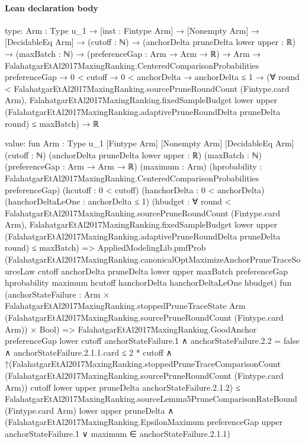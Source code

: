 \documentclass[10pt]{article}
\begin{document}
\paragraph{Lean declaration body}
\begin{ReviewVerbatim}
type:
{Arm : Type u_1} →
  [inst : Fintype Arm] →
    [Nonempty Arm] →
      [DecidableEq Arm] →
        (cutoff : ℕ) →
          (anchorDelta pruneDelta lower upper : ℝ) →
            (maxBatch : ℕ) →
              (preferenceGap : Arm → Arm → ℝ) →
                Arm →
                  FalahatgarEtAl2017MaxingRanking.CenteredComparisonProbabilities preferenceGap →
                    0 < cutoff →
                      0 < anchorDelta →
                        anchorDelta ≤ 1 →
                          (∀ round < FalahatgarEtAl2017MaxingRanking.sourcePruneRoundCount (Fintype.card Arm),
                              FalahatgarEtAl2017MaxingRanking.fixedSampleBudget lower upper
                                  (FalahatgarEtAl2017MaxingRanking.adaptivePruneRoundDelta pruneDelta round) ≤
                                maxBatch) →
                            ℝ

value:
fun {Arm : Type u_1} [Fintype Arm] [Nonempty Arm] [DecidableEq Arm] (cutoff : ℕ)
    (anchorDelta pruneDelta lower upper : ℝ) (maxBatch : ℕ) (preferenceGap : Arm → Arm → ℝ) (maximum : Arm)
    (hprobability : FalahatgarEtAl2017MaxingRanking.CenteredComparisonProbabilities preferenceGap)
    (hcutoff : 0 < cutoff) (hanchorDelta : 0 < anchorDelta) (hanchorDeltaLeOne : anchorDelta ≤ 1)
    (hbudget :
      ∀ round < FalahatgarEtAl2017MaxingRanking.sourcePruneRoundCount (Fintype.card Arm),
        FalahatgarEtAl2017MaxingRanking.fixedSampleBudget lower upper
            (FalahatgarEtAl2017MaxingRanking.adaptivePruneRoundDelta pruneDelta round) ≤
          maxBatch) =>
  AppliedModelingLib.pmfProb
    (FalahatgarEtAl2017MaxingRanking.canonicalOptMaximizeAnchorPruneTraceSourceLaw cutoff anchorDelta pruneDelta lower
      upper maxBatch preferenceGap hprobability maximum hcutoff hanchorDelta hanchorDeltaLeOne hbudget)
    fun
      (anchorStateFailure :
        Arm ×
          FalahatgarEtAl2017MaxingRanking.stoppedPruneTraceState Arm
              (FalahatgarEtAl2017MaxingRanking.sourcePruneRoundCount (Fintype.card Arm)) ×
            Bool) =>
    FalahatgarEtAl2017MaxingRanking.GoodAnchor preferenceGap lower cutoff anchorStateFailure.1 ∧
      anchorStateFailure.2.2 = false ∧
        anchorStateFailure.2.1.1.card ≤ 2 * cutoff ∧
          ↑(FalahatgarEtAl2017MaxingRanking.stoppedPruneTraceComparisonCount
                  (FalahatgarEtAl2017MaxingRanking.sourcePruneRoundCount (Fintype.card Arm)) cutoff lower upper
                  pruneDelta anchorStateFailure.2.1.2) ≤
              FalahatgarEtAl2017MaxingRanking.sourceLemma5PruneComparisonRateBound (Fintype.card Arm) lower upper
                pruneDelta ∧
            (FalahatgarEtAl2017MaxingRanking.EpsilonMaximum preferenceGap upper anchorStateFailure.1 ∨
              maximum ∈ anchorStateFailure.2.1.1)
\end{ReviewVerbatim}
\end{document}
